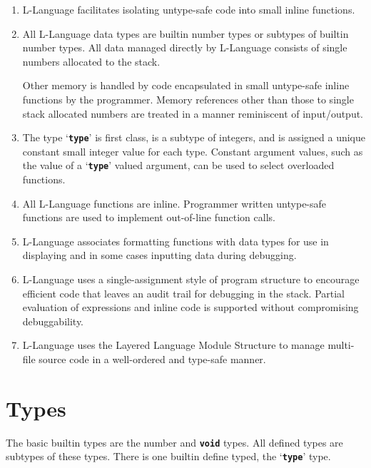 \documentclass[12pt]{article}
\newcommand{\TT}[1]{{\tt \bfseries #1}}
\begin{document}
\begin{enumerate}

\item
L-Language facilitates isolating untype-safe code into small inline functions.

\item
All L-Language data types are builtin number types or subtypes of
builtin number types.  All data managed directly by L-Language consists
of single numbers allocated to the stack.

Other memory is handled by code
encapsulated in small untype-safe inline functions by the programmer.
Memory references other than those to single stack allocated numbers
are treated in a manner reminiscent of input/output.

\item
The type `\TT{type}' is first class, is a subtype of integers, and
is assigned a unique constant small integer value for each type.  Constant
argument values, such as the value of a `\TT{type}' valued
argument, can be used to select overloaded functions.

\item
All L-Language functions are inline.  Programmer written untype-safe
functions are used to implement out-of-line function calls.

\item
L-Language associates formatting functions
with data types for use in displaying and in some cases inputting
data during debugging.

\item
L-Language uses a single-assignment style of program structure
to encourage
efficient code that leaves an audit trail for debugging in the stack.
Partial evaluation of expressions and inline code is supported without
compromising debuggability.

\item
L-Language uses the Layered Language Module Structure to manage
multi-file source code in a well-ordered and type-safe manner.


\end{enumerate}


\section{Types}
\label{TYPES}

The basic builtin types are the number and \TT{void} types.
All defined types are subtypes of these types.
There is one builtin define typed, the `\TT{type}' type.
\end{document}
